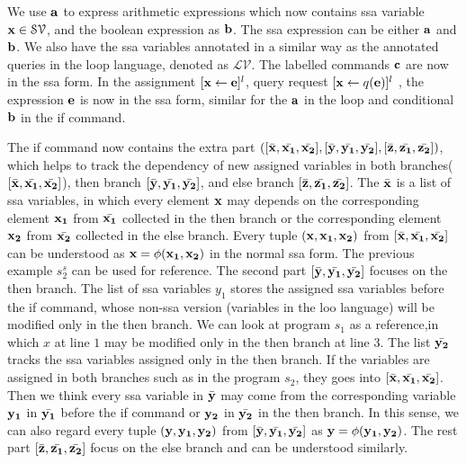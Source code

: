 \documentclass[a4paper,11pt]{article}
\begin{document}
%
%
{
We use $\mathbf{{a}}$ to express arithmetic expressions which now contains ssa variable $\mathbf{{x}} \in \mathcal{SV}$, 
and the boolean expression as $\mathbf{{b}}$. 
%
The ssa expression can be either $\mathbf{{a}}$ and $\mathbf{{b}}$. 
We also have the ssa variables annotated in a similar way as the annotated queries in the loop language, denoted as $\mathcal{LV}$. 
%
The labelled commands $\mathbf{{c}}$ are now in the ssa form. 
In the assignment $[\mathrel{ \mathbf{{x}} \leftarrow  \mathbf{{e}} }]^{l}$,  query request $[\mathrel{ {\mathbf{{x}}}  \leftarrow q({\mathbf{{e}}}) }]^{l}$ , the expression ${\mathbf{{e}}}$ is now in the ssa form, similar for the $\mathbf{{a}}$ in the loop and conditional $\mathbf{{b}}$ in the if command. 
}

{
The if command now contains the extra part 
$([\bar{\mathbf{{x}}}, \bar{\mathbf{{x_1}}}, \bar{\mathbf{{x_2}}}] , 
[\bar{\mathbf{{y}}}, \bar{\mathbf{{y_1}}}, \bar{\mathbf{{y_2}}}],
[\bar{\mathbf{{z}}}, \bar{\mathbf{{z_1}}}, \bar{\mathbf{{z_2}}}] )$, 
which helps to track the dependency of new assigned variables in both branches($[\bar{\mathbf{{x}}}, \bar{\mathbf{{x_1}}}, \bar{\mathbf{{x_2}}}]$), 
then branch $[\bar{\mathbf{{y}}}, \bar{\mathbf{{y_1}}}, \bar{\mathbf{{y_2}}}]$, 
and else branch $[\bar{\mathbf{{z}}}, \bar{\mathbf{{z_1}}}, \bar{\mathbf{{z_2}}}] $. 
The $\bar{\mathbf{{x}}}$ is a list of ssa variables, in which every element $\mathbf{{x}}$ may depends on the corresponding element $\mathbf{{x_1}}$ from $\bar{\mathbf{{x_1}}}$ collected in the then branch or the corresponding element $\mathbf{{x_2}}$ from $\bar{\mathbf{{x_2}}}$ collected in the else branch. 
%
Every tuple $(\mathbf{{x,x_1,x_2 }})$ from $[\bar{\mathbf{{x}}}, \bar{\mathbf{{x_1}}}, \bar{\mathbf{{x_2}}}]$ can be understood as $\mathbf{{x}} = \phi(\mathbf{{x_1,x_2}})$ in the normal ssa form. 
The previous example $s_2^{s}$ can be used for reference. 
The second part $[\bar{\mathbf{{y}}}, \bar{\mathbf{{y_1}}}, \bar{\mathbf{{y_2}}}]$ focuses on the then branch. 
The list of ssa variables $y_1$ stores the assigned ssa variables before the if command, whose non-ssa version (variables in the loo language) will be modified only in the then branch. 
We can look at program $s_1$ as a reference,in which $x$ at line $1$ may be modified only in the then branch at line $3$. 
The list $\bar{\mathbf{{y_2}}}$ tracks the ssa variables assigned only in the then branch. 
If the variables are assigned in both branches such as in the program $s_2$, they goes into $[\bar{\mathbf{{x}}}, \bar{\mathbf{{x_1}}}, \bar{\mathbf{{x_2}}}]$. Then we think every ssa variable in $\bar{\mathbf{{y}}}$ may come from the corresponding variable $\mathbf{{y_1}}$ in $\bar{\mathbf{{y_1}}}$ before the if command or $\mathbf{{y_2}}$ in $\bar{\mathbf{{y_2}}}$ in the then branch. 
In this sense, we can also regard every tuple $(\mathbf{{y,y_1,y_2 }})$ from $[\bar{\mathbf{{y}}}, \bar{\mathbf{{y_1}}}, \bar{\mathbf{{y_2}}}]$ as $\mathbf{{y}} = \phi(\mathbf{{y_1,y_2}})$. 
The rest part $[\bar{\mathbf{{z}}}, \bar{\mathbf{{z_1}}}, \bar{\mathbf{{z_2}}}]$ focus on the else branch and can be understood similarly. 
}
\end{document}
